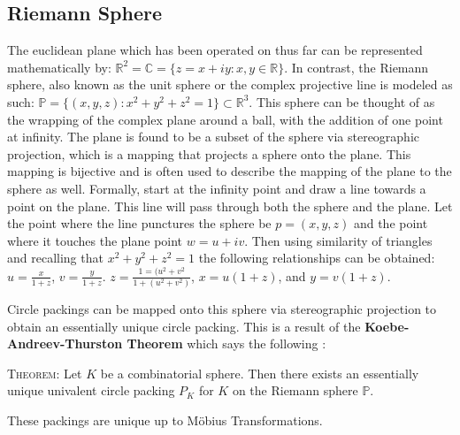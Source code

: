 \documentclass[11pt]{article}
\newcommand{\R}{\mathbb{R}}
\newcommand{\C}{\mathbb{C}}
\theoremstyle{definition}
\begin{document}
\subsection{Riemann Sphere}
The euclidean plane which has been operated on thus far can be represented mathematically by: $\R^2 = \C = \{z = x + iy : x, y \in \R \}$. In contrast, the Riemann sphere, also known as the unit sphere or the complex projective line is modeled as such: $\mathbb{P} = \{(x,y,z):x^2 + y^2 + z^2 = 1\} \subset \R^3$. This sphere can be thought of as the wrapping of the complex plane around a ball, with the addition of one point at infinity. The plane is found to be a subset of the sphere via stereographic projection, which is a mapping that projects a sphere onto the plane. This mapping is bijective and is often used to describe the mapping of the plane to the sphere as well. Formally, start at the infinity point and draw a line towards a point on the plane. This line will pass through both the sphere and the plane. Let the point where the line punctures the sphere be $p = (x,y,z)$ and the point where it touches the plane point $w = u + iv$. Then using similarity of triangles and recalling that $x^2 + y^2 + z^2 = 1$ the following relationships can be obtained: $u = \frac{x}{1 + z}$, $v = \frac{y}{1+ z}$. $z = \frac{1 = (u^2 + v^2}{1 + (u^2 + v^2)}$, $x = u(1+z)$, and $y =v(1+z)$.

Circle packings can be mapped onto this sphere via stereographic projection to obtain an essentially unique circle packing. This is a result of the \textbf{Koebe-Andreev-Thurston Theorem} which says the following \cite{stephenson05introduction}:

\textsc{Theorem}: Let $K$ be a combinatorial sphere. Then there exists an essentially unique univalent circle packing $P_K$ for $K$ on the Riemann sphere $\mathbb{P}$.

These packings are unique up to M\"{o}bius Transformations.
\end{document}
